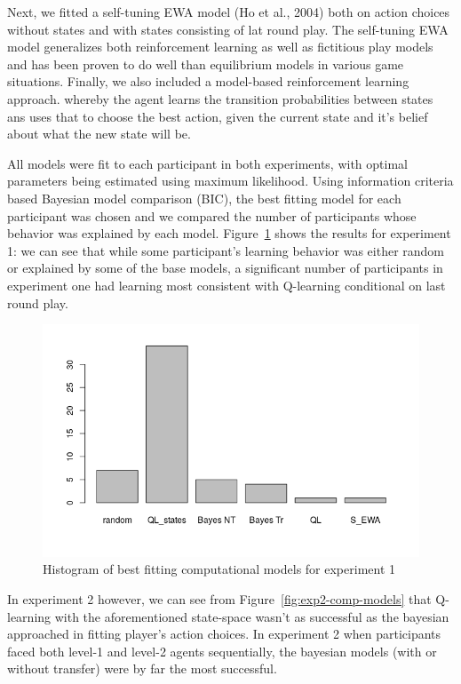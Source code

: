 \documentclass[man,floatsintext]{apa6}
\begin{document}
Next, we fitted a self-tuning EWA model (Ho et al., 2004) both on action choices without states and with states consisting of lat round play. The self-tuning EWA model generalizes both reinforcement learning as well as fictitious play models and has been proven to do well than equilibrium models in various game situations. Finally, we also included a model-based reinforcement learning approach. whereby the agent learns the transition probabilities between states ans uses that to choose the best action, given the current state and it's belief about what the new state will be.

All models were fit to each participant in both experiments, with optimal parameters being estimated using maximum likelihood. Using information criteria based Bayesian model comparison (BIC), the best fitting model for each participant was chosen and we compared the number of participants whose behavior was explained by each model. Figure~\ref{fig:exp1-comp-models} shows the results for experiment 1: we can see that while some participant's learning behavior was either random or explained by some of the base models, a significant number of participants in experiment one had learning most consistent with Q-learning conditional on last round play.

\begin{figure}

{\centering \includegraphics{../Report/images/exp1_comp_models} 

}

\caption{Histogram of best fitting computational models for experiment 1}\label{fig:exp1-comp-models}
\end{figure}

In experiment 2 however, we can see from Figure~\ref{fig:exp2-comp-models} that Q-learning with the aforementioned state-space wasn't as successful as the bayesian approached in fitting player's action choices. In experiment 2 when participants faced both level-1 and level-2 agents sequentially, the bayesian models (with or without transfer) were by far the most successful.
\end{document}
